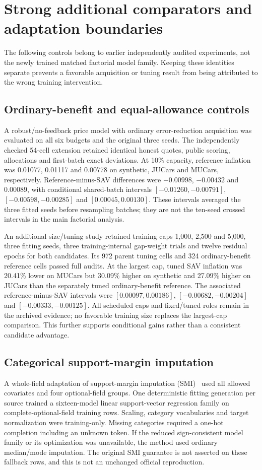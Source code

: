 \section{Strong additional comparators and adaptation boundaries}\label{app:comparators}
The following controls belong to earlier independently audited experiments,
not the newly trained matched factorial model family. Keeping these identities
separate prevents a favorable acquisition or tuning result from being attributed
to the wrong training intervention.

\subsection{Ordinary-benefit and equal-allowance controls}
A robust/no-feedback price model with ordinary error-reduction acquisition was
evaluated on all six budgets and the original three seeds. The independently
checked 54-cell extension retained identical honest quotes, public scoring,
allocations and first-batch exact deviations. At 10\% capacity, reference
inflation was 0.01077, 0.01117 and 0.00778 on synthetic, JUCars and MUCars,
respectively. Reference-minus-SAV differences were $-0.00998$, $-0.00432$
and $0.00089$, with conditional shared-batch intervals
$[-0.01260,-0.00791]$, $[-0.00598,-0.00285]$ and $[0.00045,0.00130]$.
These intervals averaged the three fitted seeds before resampling batches;
they are not the ten-seed crossed intervals in the main factorial analysis.

An additional size/tuning study retained training caps 1,000, 2,500 and 5,000,
three fitting seeds, three training-internal gap-weight trials and twelve
residual epochs for both candidates. Its 972 parent tuning cells and 324
ordinary-benefit reference cells passed full audits. At the largest cap,
tuned SAV inflation was 20.41\% lower on MUCars but 30.09\% higher on
synthetic and 27.09\% higher on JUCars than the separately tuned ordinary-benefit
reference. The associated reference-minus-SAV intervals were
$[0.00097,0.00186]$, $[-0.00682,-0.00204]$ and $[-0.00333,-0.00125]$.
All scheduled caps and fixed/tuned roles remain in the archived evidence;
no favorable training size replaces the largest-cap comparison. This further
supports conditional gains rather than a consistent candidate advantage.

\subsection{Categorical support-margin imputation}
A whole-field adaptation of support-margin imputation (SMI)~\cite{smi} used
all allowed covariates and four optional-field groups. One deterministic
fitting generation per source trained a sixteen-model linear support-vector
regression family on complete-optional-field training rows. Scaling, category
vocabularies and target normalization were training-only. Missing categories
required a one-hot completion including an unknown token. If the reduced
sign-consistent model family or its optimization was unavailable, the method
used ordinary median/mode imputation. The original SMI guarantee is not
asserted on these fallback rows, and this is not an unchanged official reproduction.

